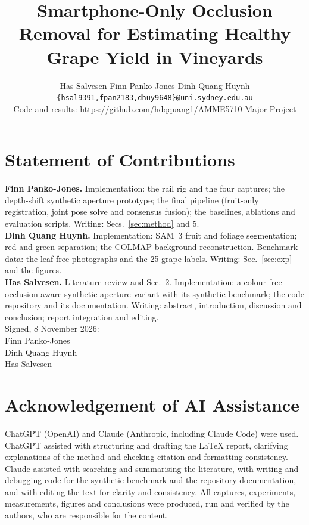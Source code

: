 \documentclass[10pt,twocolumn,letterpaper]{article}
\title{Smartphone-Only Occlusion Removal for Estimating Healthy Grape Yield in Vineyards}
\author{
Has Salvesen \qquad Finn Panko-Jones \qquad Dinh Quang Huynh\\
{\tt\small \{hsal9391,fpan2183,dhuy9648\}@uni.sydney.edu.au}\\[2pt]
{\small Code and results: \url{https://github.com/hdqquang1/AMME5710-Major-Project}}
}
\begin{document}
\maketitle
    







{
    \small
    
    
}
\newpage
\section*{Statement of Contributions}
\noindent\textbf{Finn Panko-Jones.} Implementation: the rail rig and the four captures; the depth-shift synthetic aperture prototype; the final pipeline (fruit-only registration, joint pose solve and consensus fusion); the baselines, ablations and evaluation scripts. Writing: Secs.~\ref{sec:method} and 5.\\[2pt]
\textbf{Dinh Quang Huynh.} Implementation: SAM~3 fruit and foliage segmentation; red and green separation; the COLMAP background reconstruction. Benchmark data: the leaf-free photographs and the 25 grape labels. Writing: Sec.~\ref{sec:exp} and the figures.\\[2pt]
\textbf{Has Salvesen.} Literature review and Sec.~2. Implementation: a colour-free occlusion-aware synthetic aperture variant with its synthetic benchmark; the code repository and its documentation. Writing: abstract, introduction, discussion and conclusion; report integration and editing.\\[6pt]
\noindent Signed, 8 November 2026:\\[10pt]
\noindent Finn Panko-Jones \hrulefill\hspace{0.02\linewidth}\\[12pt]
\noindent Dinh Quang Huynh \hrulefill\hspace{0.02\linewidth}\\[12pt]
\noindent Has Salvesen \hrulefill\hspace{0.02\linewidth}

\section*{Acknowledgement of AI Assistance}
ChatGPT (OpenAI) and Claude (Anthropic, including Claude Code) were used. ChatGPT assisted with structuring and drafting the LaTeX report, clarifying explanations of the method and checking citation and formatting consistency. Claude assisted with searching and summarising the literature, with writing and debugging code for the synthetic benchmark and the repository documentation, and with editing the text for clarity and consistency. All captures, experiments, measurements, figures and conclusions were produced, run and verified by the authors, who are responsible for the content.
% 
\end{document}
